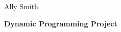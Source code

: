 \documentclass[12pt]{article}
\begin{document}
\newcommand{\I}{\mbox{{\em Int}}}
\newcommand{\lt}{\mbox{{\em left}}}
\newcommand{\rt}{\mbox{{\em right}}}
\newcommand{\ld}{\Delta^l}
\newcommand{\rd}{\Delta^r}
\newcommand{\lsp}[1]{\large\renewcommand{\baselinestretch}{#1}\normalsize}
\newcommand{\hsp}{\hspace{.2in}}

\def\Endwhile{\mbox{\bf endwhile\ }}
\def\Or{\mbox{\bf or\ }}
\def\Do{\mbox{\bf do\ }}
\def\Downto{\mbox{\bf downto\ }}
\def\Int{\mbox{\bf int\ }}
\def\To{\mbox{\bf to\ }}
\def\Repeat{\mbox{\bf repeat\ }}
\def\Until{\mbox{\bf until\ }}
\def\Return{\mbox{\bf return\ }}
\def\Not{\mbox{\bf not\ }}
\def\And{\mbox{\bf and\ }}
\def\For{\mbox{\bf for\ }}
\def\Foreach{\mbox{\bf foreach\ }}
\def\Else{\mbox{\bf else\ }}
\def\Elseif{\mbox{\bf elseif\ }}
\def\End{\mbox{\bf end\ }}
\def\If{\mbox{\bf if\ }}
\def\Mod{\mbox{\bf \ mod\ }}
\def\Then{\mbox{\bf then\ }}
\def\While{\mbox{\bf while\ }}
\def\Output{\mbox{\bf output\ }}


\lsp{1}
\pagestyle{plain}
\hfill Ally Smith
\begin{center}
{\bf
Dynamic Programming Project
}
\end{center}
\end{document}
